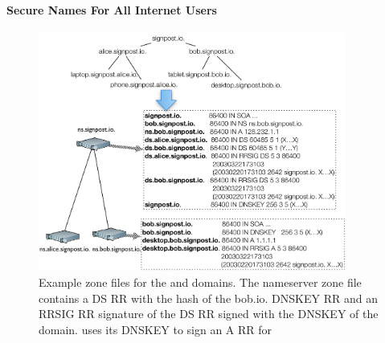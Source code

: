 \paragraph{Secure Names For All Internet Users}

\begin{figure}
  \centering
    \includegraphics[width=0.9\textwidth]{DNSSEC_hierarchy}
    \caption[Example \dnssec zone files.]{Example \dnssec zone files for the
       and  domains. The 
      nameserver zone file contains a DS RR with the hash of the bob.io.  DNSKEY
      RR and an RRSIG RR signature of the DS RR signed with the DNSKEY of the
       domain.  uses its DNSKEY to sign an A RR for
      }
  \label{fig:dnssec_hierarchy}
\end{figure}


